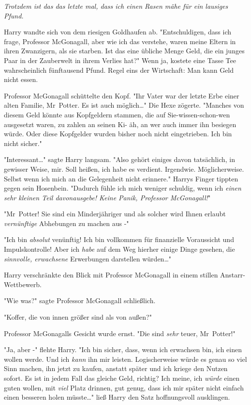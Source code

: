 {\emph{Trotzdem ist das das letzte mal, dass ich einen Rasen mähe für ein lausiges Pfund.}

Harry wandte sich von dem riesigen Goldhaufen ab. "Entschuldigen, dass ich frage, Professor McGonagall, aber wie ich das verstehe, waren meine Eltern in ihren Zwanzigern, als sie starben. Ist das eine übliche Menge Geld, die ein junges Paar in der Zauberwelt in ihrem Verlies hat?" Wenn ja, kostete eine Tasse Tee wahrscheinlich fünftausend Pfund. Regel eins der Wirtschaft: Man kann Geld nicht essen.

Professor McGonagall schüttelte den Kopf. "Ihr Vater war der letzte Erbe einer alten Familie, Mr~Potter. Es ist auch möglich…" Die Hexe zögerte. "Manches von diesem Geld könnte aus Kopfgeldern stammen, die auf Sie-wissen-schon-wen ausgesetzt waren, zu zahlen an seinen Ki- äh, an wer auch immer ihn besiegen würde. Oder diese Kopfgelder wurden bisher noch nicht eingetrieben. Ich bin nicht sicher."

"Interessant…" sagte Harry langsam. "Also gehört einiges davon tatsächlich, in gewisser Weise, mir. Soll heißen, ich habe es verdient. Irgendwie. Möglicherweise. Selbst wenn ich mich an die Gelegenheit nicht erinnere." Harrys Finger tippten gegen sein Hosenbein. "Dadurch fühle ich mich weniger schuldig, wenn ich \emph{einen sehr kleinen Teil davonausgebe! Keine Panik, Professor McGonagall!}"

"Mr~Potter! Sie sind ein Minderjähriger und als solcher wird Ihnen erlaubt \emph{vernünftige} Abhebungen zu machen aus -"

"Ich bin \emph{absolut} venünftig! Ich bin vollkommen für finanzielle Voraussicht und Impulskontrolle! Aber ich \emph{habe} auf dem Weg hierher einige Dinge gesehen, die \emph{sinnvolle, erwachsene} Erwerbungen darstellen würden…"

Harry verschränkte den Blick mit Professor McGonagall in einem stillen Anstarr-Wettbewerb.

"Wie was?" sagte Professor McGonagall schließlich.

"Koffer, die von innen größer sind als von außen?"

Professor McGonagalls Gesicht wurde ernst. "Die sind \emph{sehr} teuer, Mr~Potter!"

"Ja, aber -" flehte Harry. "Ich bin sicher, dass, wenn ich erwachsen bin, ich einen wollen werde. Und ich \emph{kann} ihn mir leisten. Logischerweise würde es genau so viel Sinn machen, ihn jetzt zu kaufen, anstatt später und ich kriege den Nutzen sofort. Es ist in jedem Fall das gleiche Geld, richtig? Ich meine, ich \emph{würde} einen guten wollen, mit \emph{viel} Platz drinnen, gut genug, dass ich mir später nicht einfach einen besseren holen müsste…" ließ Harry den Satz hoffnungsvoll ausklingen.

}
